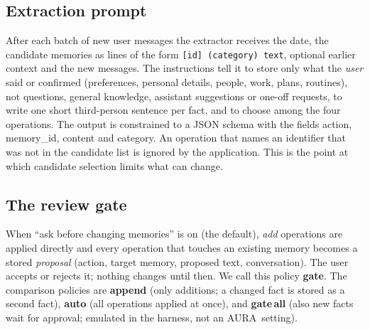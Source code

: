 \IfFileExists{IEEEtran.cls}{\documentclass[journal]{IEEEtran}\def\HAVEIEEE{1}}{\documentclass[10pt,twocolumn]{article}\usepackage[margin=0.7in,columnsep=0.25in]{geometry}}
\newcommand{\aura}{AURA}
\begin{document}
\begin{table}[t]
\centering\footnotesize
\caption{Memory and proposal records.}
\label{tab:model}
\end{table}

\subsection{Extraction prompt}
After each batch of new user messages the extractor receives the date, the candidate memories as lines of the form \texttt{[id] (category) text}, optional earlier context and the new messages. The instructions tell it to store only what the \emph{user} said or confirmed (preferences, personal details, people, work, plans, routines), not questions, general knowledge, assistant suggestions or one-off requests, to write one short third-person sentence per fact, and to choose among the four operations. The output is constrained to a JSON schema with the fields action, memory\_id, content and category. An operation that names an identifier that was not in the candidate list is ignored by the application. This is the point at which candidate selection limits what can change.

\subsection{The review gate}
When ``ask before changing memories'' is on (the default), \emph{add} operations are applied directly and every operation that touches an existing memory becomes a stored \emph{proposal} (action, target memory, proposed text, conversation). The user accepts or rejects it; nothing changes until then. We call this policy \textbf{gate}. The comparison policies are \textbf{append} (only additions; a changed fact is stored as a second fact), \textbf{auto} (all operations applied at once), and \textbf{gate\,all} (also new facts wait for approval; emulated in the harness, not an \aura\ setting).
\end{document}
